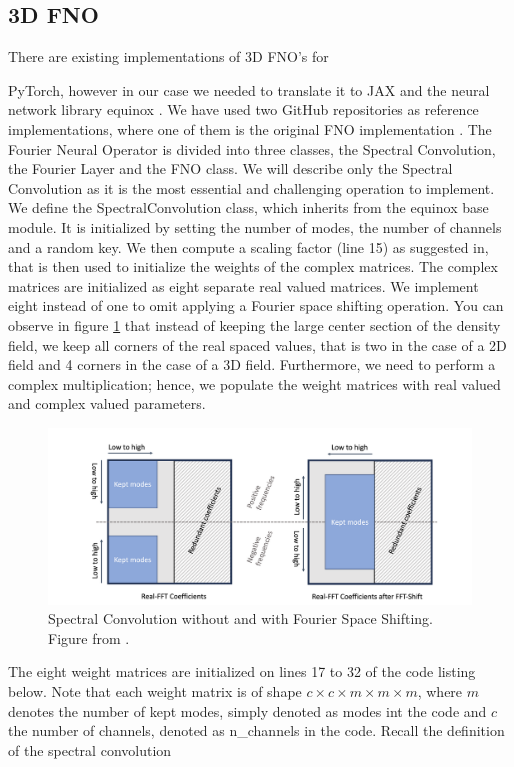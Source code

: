 \documentclass{article}
\begin{document}
\subsection{3D FNO}

There are existing implementations of 3D FNO's for {PyTorch, however in our case we needed to translate it to {JAX} \cite{jax2018github} and the neural network library equinox \citep{kidger2021equinox}. We have used two GitHub repositories as reference implementations, where one of them is the original FNO implementation \citep{machinelearningsimulation, kossaifi2024neural}. The Fourier Neural Operator is divided into three classes, the Spectral Convolution, the Fourier Layer and the FNO class. We will describe only the Spectral Convolution as it is the most essential and challenging operation to implement. We define the {SpectralConvolution} class, which inherits from the equinox base module. It is initialized by setting the number of modes, the number of channels and a random key.  We then compute a scaling factor (line 15) as suggested in, \citep{li2020fourier} that is then used to initialize the weights of the complex matrices. The complex matrices are initialized as eight separate real valued matrices. We implement eight instead of one to omit applying a Fourier space shifting operation. You can observe in figure \ref{fig:shifting} that instead of keeping the large center section of the density field, we keep all corners of the real spaced values, that is two in the case of a 2D field and 4 corners in the case of a 3D field. Furthermore, we need to perform a complex multiplication; hence, we populate the weight matrices with real valued and complex valued parameters. 

\begin{figure}[h]
    \centering
    \includegraphics[width=0.75\linewidth]{img/image.png}
    \caption{Spectral Convolution without and with Fourier Space Shifting. Figure from  \cite{kossaifi2024neural}.}
    \label{fig:shifting}
\end{figure}

The eight weight matrices are initialized on lines 17 to 32 of the code listing below. Note that each weight matrix is of shape $c \times c \times m \times m \times m$, where $m$ denotes the number of kept modes, simply denoted as modes int the code and $c$ the number of channels, denoted as {n\_channels} in the code. Recall the definition of the spectral convolution

}
\end{document}
